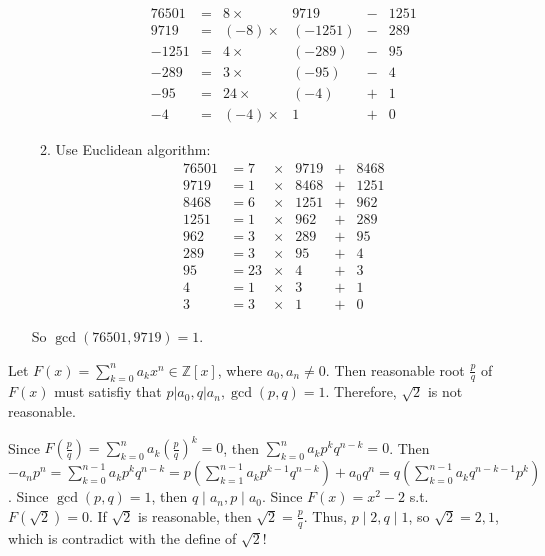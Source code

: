 \documentclass{ctexart}
\begin{document}
\begin{solution}
\begin{enumerate}
\begin{enumerate}
          \[
            \begin{aligned}
              76501 & = & 8   \times   & 9719    & - & 1251 \\
              9719  & = & (-8)  \times & (-1251) & - & 289  \\
              -1251 & = & 4   \times   & (-289)  & - & 95   \\
              -289  & = & 3   \times   & (-95)   & - & 4    \\
              -95   & = & 24  \times   & (-4)    & + & 1    \\
              -4    & = & (-4)  \times & 1       & + & 0
            \end{aligned}
          \]
        \item Use Euclidean algorithm:\\
          \[
            \begin{aligned}
              76501 & = 7  & \times & 9719 & + & 8468 \\
              9719  & = 1  & \times & 8468 & + & 1251 \\
              8468  & = 6  & \times & 1251 & + & 962  \\
              1251  & = 1  & \times & 962  & + & 289  \\
              962   & = 3  & \times & 289  & + & 95   \\
              289   & =3   & \times & 95   & + & 4    \\
              95    & = 23 & \times & 4    & + & 3    \\
              4     & = 1  & \times & 3    & + & 1    \\
              3     & = 3  & \times & 1    & + & 0
            \end{aligned}
          \]
      \end{enumerate}
      So \(\gcd(76501,9719)=1\).
  \end{enumerate}

\end{solution}
\begin{problem}
  Let \(F(x)=\sum_{k=0}^na_kx^{n} \in \mathbb{Z}[x]\), where \(a_0,a_n \neq 0\). Then reasonable root \(\frac{p}{q}\) of \(F(x)\)
  must satisfiy that \(p | a_0, q | a_n, \gcd(p,q)=1\). Therefore, \(\sqrt{2}\) is not reasonable.

\end{problem}
\begin{solution}
  Since \(F(\frac{p}{q}) = \sum_{k=0}^na_k (\frac{p}{q})^{k}=0\), then \(\sum_{k=0}^na_kp^{k}q^{n-k}=0\).
  Then \(-a_np^n=\sum_{k=0}^{n-1}a_kp^{k}q^{n-k}=p(\sum_{k=1}^{n-1}a_kp^{k-1}q^{n-k})+a_0q^n=q(\sum_{k=0}^{n-1}a_kq^{n-k-1}p^{k})\).
  Since \(\gcd(p,q) = 1\), then \(q \mid a_n, p \mid a_0\).
  Since \(F(x)=x^2-2\) s.t. \(F(\sqrt{2}) = 0\). If \(\sqrt{2}\) is reasonable, then \(\sqrt{2} =\frac{p}{q}\).
  Thus, \(p \mid 2, q \mid 1\), so \(\sqrt{2}=2,1\), which is contradict with the define of \(\sqrt{2}\)!
\end{solution}
\end{document}
